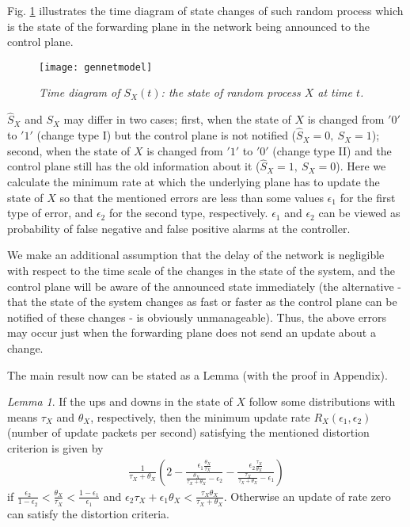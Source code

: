 \documentclass[conference]{IEEEtran}
\theoremstyle{plain}
\theoremstyle{remark}
\newtheorem{lemma}{Lemma}
\begin{document}
Fig. \ref{fig:statetime} illustrates the time diagram of state changes of such random process which is the state of the forwarding plane in the network being announced to the control plane. 

\begin{figure}[http]
    \center
      \texttt{[image: gennetmodel]}\\
      \caption{\textit{Time diagram of $S_X(t)$: the state of random process $X$ at time $t$.}}
    \label{fig:statetime}
\end{figure}


$\hat{S}_X$ and $S_X$ may differ in two cases; first, when the state of $X$ is changed from $'0'$ to $'1'$ (change type I) but the control plane is not notified ($\hat{S}_X=0,\ S_X=1$); second, when the state of $X$ is changed from $'1'$ to $'0'$ (change type II) and the control plane still has the old information about it ($\hat{S}_X=1,\ S_X=0$). Here we calculate the minimum rate at which the underlying plane has to update the state of $X$ so that the mentioned errors are less than some values $\epsilon_1$ for the first type of error, and $\epsilon_2$ for the second type, respectively. $\epsilon_1$ and $\epsilon_2$ can be viewed as probability of false negative and false positive alarms at the controller.

We make an additional assumption that the delay of the network is negligible with respect to the time scale of the changes in the state of the system, and the control plane will be aware of the announced state immediately (the alternative - that the state of the system changes as fast or faster as the control plane can be notified of these changes - is obviously unmanageable). Thus, the above errors may occur just when the forwarding plane does not send an update about a change.

The main result now can be stated as a Lemma (with the proof in Appendix).

\begin{lemma}\label{lem:01}
	If the ups and downs in the state of $X$ follow some distributions with means $\tau_X$ and $\theta_X$, respectively, then the minimum update rate $R_X(\epsilon_1,\epsilon_2)$ (number of update packets per second) satisfying the mentioned distortion criterion is given by
\begin{eqnarray}
\frac{1}{\tau_X+\theta_X}(2-\frac{\epsilon_1\frac{\theta_X}{\tau_X}}{\frac{\theta_X}{\tau_X+\theta_X}-\epsilon_2}-\frac{\epsilon_2\frac{\tau_X}{\theta_X}}{\frac{\tau_X}{\tau_X+\theta_X}-\epsilon_1}) \label{eq:rX}
\end{eqnarray}
if $\frac{\epsilon_2}{1-\epsilon_2} < \frac{\theta_X}{\tau_X} < \frac{1-\epsilon_1}{\epsilon_1}$ and $\epsilon_2 \tau_X+\epsilon_1 \theta_X < \frac{\tau_X \theta_X}{\tau_X+\theta_X}$. Otherwise an update of rate zero can satisfy the distortion criteria.
\end{lemma}
\end{document}
